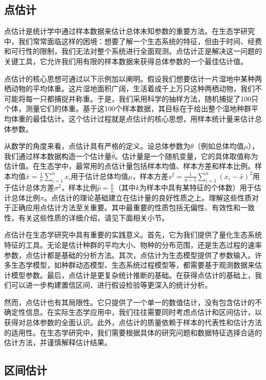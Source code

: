 \documentclass[
  twoside,12pt,fontset=none]{ctexbook}
\begin{document}
\hypertarget{ux70b9ux4f30ux8ba1}{%
\subsection{点估计}\label{ux70b9ux4f30ux8ba1}}

点估计是统计学中通过样本数据来估计总体未知参数的重要方法。在生态学研究中，我们常常面临这样的困境：想要了解一个生态系统的特征，但由于时间、经费和可行性的限制，我们无法对整个系统进行全面观测。点估计正是解决这一问题的关键工具，它允许我们用有限的样本数据来获得总体参数的一个最佳估计值。

点估计的核心思想可通过以下示例加以阐明。假设我们想要估计一片湿地中某种两栖动物的平均体重。这片湿地面积广阔，生活着成千上万只这种两栖动物，我们不可能将每一只都捕捉并称重。于是，我们采用科学的抽样方法，随机捕捉了100只个体，测量它们的体重。基于这100个样本数据，其目标在于给出整个湿地种群平均体重的最佳估计。这个估计过程就是点估计的核心思想，用样本统计量来估计总体参数。

从数学的角度来看，点估计具有严格的定义。设总体参数为\(\theta\)（例如总体均值\(\mu\)），我们通过样本数据构造一个估计量\(\hat{\theta}\)。估计量是一个随机变量，它的具体取值称为估计值。在生态学中，最常用的点估计量包括样本均值、样本方差和样本比例。样本均值\(\bar{x} = \frac{1}{n}\sum_{i=1}^{n} x_i\)用于估计总体均值\(\mu\)，样本方差\(s^2 = \frac{1}{n-1}\sum_{i=1}^{n} (x_i - \bar{x})^2\)用于估计总体方差\(\sigma^2\)，样本比例\(\hat{p} = \frac{k}{n}\)（其中\(k\)为样本中具有某特征的个体数）用于估计总体比例\(\pi\)。点估计的理论基础建立在估计量的良好性质之上。理解这些性质对于正确应用点估计方法至关重要。其中最重要的性质包括无偏性、有效性和一致性，有关这些性质的详细介绍，请见下面相关小节。

点估计在生态学研究中具有重要的实践意义。首先，它为我们提供了量化生态系统特征的工具。无论是估计种群的平均大小、物种的分布范围，还是生态过程的速率参数，点估计都是基础的分析方法。其次，点估计为生态模型提供了参数输入。许多生态学模型，如种群动态模型、生态系统过程模型等，都需要基于观测数据来估计模型参数。最后，点估计是更复杂统计推断的基础。在获得点估计的基础上，我们可以进一步构建置信区间、进行假设检验等更深入的统计分析。

然而，点估计也有其局限性。它只提供了一个单一的数值估计，没有包含估计的不确定性信息。在实际生态学应用中，我们往往需要同时考虑点估计和区间估计，以获得对总体参数的全面认识。此外，点估计的质量依赖于样本的代表性和估计方法的适用性。在生态学研究中，我们需要根据具体的研究问题和数据特征选择合适的估计方法，并谨慎解释估计结果。

\hypertarget{ux533aux95f4ux4f30ux8ba1}{%
\subsection{区间估计}\label{ux533aux95f4ux4f30ux8ba1}}
\end{document}
